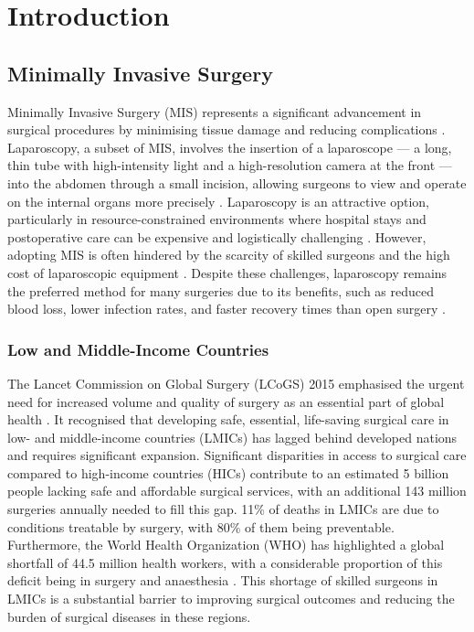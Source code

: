 \section{Introduction}

\subsection{Minimally Invasive Surgery}

Minimally Invasive Surgery (MIS) represents a significant advancement in surgical procedures by minimising tissue damage and reducing complications \cite{jaffray_minimally_2005}. Laparoscopy, a subset of MIS, involves the insertion of a laparoscope — a long, thin tube with high-intensity light and a high-resolution camera at the front — into the abdomen through a small incision, allowing surgeons to view and operate on the internal organs more precisely \cite{monnet_laparoscopy_2003}. Laparoscopy is an attractive option, particularly in resource-constrained environments where hospital stays and postoperative care can be expensive and logistically challenging \cite{rockall_laparoscopy_2014}. However, adopting MIS is often hindered by the scarcity of skilled surgeons and the high cost of laparoscopic equipment \cite{meara_global_2015}. Despite these challenges, laparoscopy remains the preferred method for many surgeries due to its benefits, such as reduced blood loss, lower infection rates, and faster recovery times than open surgery \cite{jaffray_minimally_2005}.

\subsubsection{Low and Middle-Income Countries}

The Lancet Commission on Global Surgery (LCoGS) 2015 emphasised the urgent need for increased volume and quality of surgery as an essential part of global health \cite{meara_global_2015}. It recognised that developing safe, essential, life-saving surgical care in low- and middle-income countries (LMICs) has lagged behind developed nations and requires significant expansion. Significant disparities in access to surgical care compared to high-income countries (HICs) contribute to an estimated 5 billion people lacking safe and affordable surgical services, with an additional 143 million surgeries annually needed to fill this gap. 11\% of deaths in LMICs are due to conditions treatable by surgery, with 80\% of them being preventable. Furthermore, the World Health Organization (WHO) has highlighted a global shortfall of 44.5 million health workers, with a considerable proportion of this deficit being in surgery and anaesthesia \cite{world_health_organization_world_2016}. This shortage of skilled surgeons in LMICs is a substantial barrier to improving surgical outcomes and reducing the burden of surgical diseases in these regions. 

